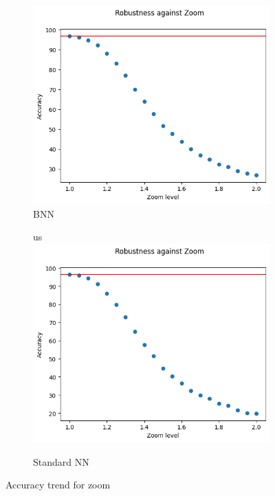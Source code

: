 \begin{figure}[h]
	\centering
	\begin{subfigure}{.5\textwidth}
		\centering
		\includegraphics[width=0.9\linewidth]{ImageFiles/EvalBNN/ZO/WU/acc}
		\caption{BNN}
		\label{fig:zo_acc_wu_bnn}
	\end{subfigure}%
	\begin{subfigure}{.5\textwidth}
		\centering
		us		\includegraphics[width=0.9\linewidth]{ImageFiles/EvalANN/zoom_ann}
		\caption{Standard NN}
		\label{fig:zoom_ann}
	\end{subfigure}
	\caption{Accuracy trend for zoom}
	\label{fig:acc_zo_wu}
\end{figure}


